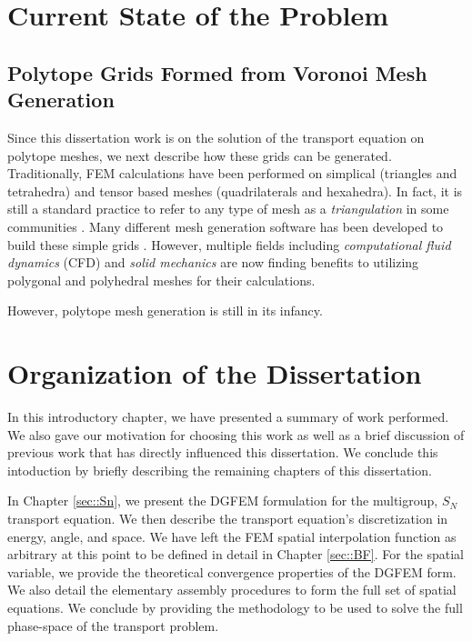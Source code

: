 \section{Current State of the Problem}
\label{sec::Intro_Past}

\subsection{Polytope Grids Formed from Voronoi Mesh Generation}
\label{sec::Intro_Past_Voronoi}

Since this dissertation work is on the solution of the transport equation on polytope meshes, we next describe how these grids can be generated. Traditionally, FEM calculations have been performed on simplical (triangles and tetrahedra) and tensor based meshes (quadrilaterals and hexahedra). In fact, it is still a standard practice to refer to any type of mesh as a {\em triangulation} in some communities \cite{ern2013theory}. Many different mesh generation software has been developed to build these simple grids \cite{shewchuk1996triangle,shewchuk2002delaunay,si2015tetgen,geuzaine2009gmsh}. However, multiple fields including {\em computational fluid dynamics} (CFD) and {\em solid mechanics} are now finding benefits to utilizing polygonal and polyhedral meshes for their calculations.

However, polytope mesh generation is still in its infancy. 

\section{Organization of the Dissertation}
\label{sec::Intro_Organization}

In this introductory chapter, we have presented a summary of work performed. We also gave our motivation for choosing this work as well as a brief discussion of previous work that has directly influenced this dissertation. We conclude this intoduction by briefly describing the remaining chapters of this dissertation.

In Chapter \ref{sec::Sn}, we present the DGFEM formulation for the multigroup, $S_N$ transport equation. We then describe the transport equation's discretization in energy, angle, and space. We have left the FEM spatial interpolation function as arbitrary at this point to be defined in detail in Chapter \ref{sec::BF}. For the spatial variable, we provide the theoretical convergence properties of the DGFEM form. We also detail the elementary assembly procedures to form the full set of spatial equations. We conclude by providing the methodology to be used to solve the full phase-space of the transport problem.

